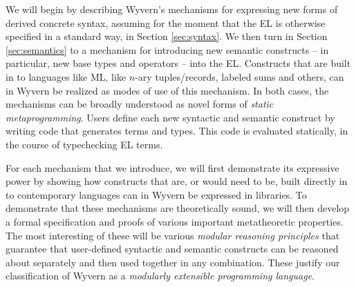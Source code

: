 We will begin by describing Wyvern's mechanisms for expressing new forms of derived concrete syntax, assuming for the moment that the EL is otherwise specified in a standard way, in Section \ref{sec:syntax}. We then turn in Section \ref{sec:semantics} to a mechanism for introducing new semantic constructs -- in particular, new base types and operators -- into the EL. Constructs that are built in to languages like ML, like $n$-ary tuples/records, labeled sums and others, can in Wyvern be realized as modes of use of this mechanism. In both cases, the mechanisms can be broadly understood as novel forms of \emph{static metaprogramming}. Users define each new syntactic and semantic construct by writing code that generates terms and types. This code is  evaluated statically, in the course of typechecking EL terms.




For each mechanism that we introduce, we will first demonstrate its expressive power by showing how constructs that are, or would need to be, built directly in to contemporary languages can in Wyvern be expressed in libraries. To demonstrate that these mechanisms are theoretically sound, we will then develop a formal specification and proofs of various important metatheoretic properties. The most interesting of these will be various \emph{modular reasoning principles} that guarantee that user-defined syntactic and semantic constructs can be reasoned about separately and then used together in any combination. These justify our classification of Wyvern as a \emph{modularly extensible programming language}.






